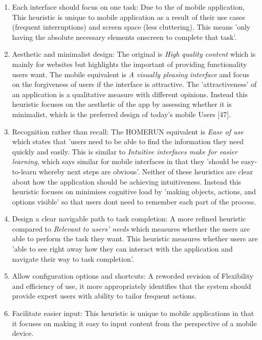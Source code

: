\documentclass[a4 paper, 12pt]{article}
\begin{document}
\begin{enumerate}
            \item \textcolor{mygreen}{Each interface should focus on one task:} Due to the  of mobile application, This heuristic is unique to mobile application as a result of their use cases (frequent interruptions) and screen space (less cluttering). This means 'only having the absolute necessary elements onscreen to complete that task'.            
            \item \textcolor{myblue}{Aesthetic and minimalist design:} The original is \textit{\textcolor{myorange}{High quality content}} which is mainly for websites but highlights the important of providing functionality users want. The mobile equivalent is \textit{\textcolor{mygreen}{A visually pleasing interface}} and focus on the forgiveness of users if the interface is attractive. The 'attractiveness' of an application is a qualitative measure with different opinions. Instead this heuristic focuses on the aesthetic of the app by assessing whether it is minimalist, which is the preferred design of today's mobile Users [47].       
            \item \textcolor{myblue}{Recognition rather than recall:} The HOMERUN equivalent is \textit{\textcolor{myorange}{Ease of use}} which states that 'users need to be able to find the information they need quickly and easily. This is similar to \textit{\textcolor{mygreen}{Intuitive interfaces make for easier learning}}, which says similar for mobile interfaces in that they 'should be easy-to-learn whereby next steps are obvious'. Neither of these heuristics are clear about how the application should be achieving intuitiveness. Instead this heuristic focuses on minimises cognitive load by 'making objects, actions, and options visible' so that users dont need to remember each part of the process.
            \item \textcolor{mygreen}{Design a clear navigable path to task completion:} A more refined heuristic compared to \textit{\textcolor{myorange}{Relevant to users’ needs}} which measures whether the users are able to perform the task they want. This heuristic measures whether users are 'able to see right away how they can interact with the application and navigate their way to task completion'.     
            \item \textcolor{mygreen}{Allow configuration options and shortcuts:} A reworded revision of \textcolor{myblue}{Flexibility and efficiency of use}, it more appropriately identifies that the system should provide expert users with ability to tailor frequent actions. 
            \item \textcolor{mygreen}{Facilitate easier input:} This heuristic is unique to mobile applications in that it focuses on making it easy to input content from the perspective of a mobile device. 
        \end{enumerate}
\end{document}
